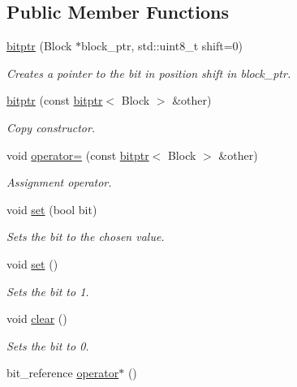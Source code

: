 \subsection*{Public Member Functions}
\begin{DoxyCompactItemize}
\item 
\mbox{\hyperlink{classirk_1_1bitptr_acd28cbb88a0840befdd9bc7a7260f036}{bitptr}} (Block $\ast$block\+\_\+ptr, std\+::uint8\+\_\+t shift=0)
\begin{DoxyCompactList}\small\item\em Creates a pointer to the bit in position {\ttfamily shift} in {\ttfamily block\+\_\+ptr}. \end{DoxyCompactList}\item 
\mbox{\hyperlink{classirk_1_1bitptr_aa1c908a8d26c9286270ccb73ca5a3d85}{bitptr}} (const \mbox{\hyperlink{classirk_1_1bitptr}{bitptr}}$<$ Block $>$ \&other)
\begin{DoxyCompactList}\small\item\em Copy constructor. \end{DoxyCompactList}\item 
void \mbox{\hyperlink{classirk_1_1bitptr_a60b3f1dcb2d6c9f8102c0e077937dcc5}{operator=}} (const \mbox{\hyperlink{classirk_1_1bitptr}{bitptr}}$<$ Block $>$ \&other)
\begin{DoxyCompactList}\small\item\em Assignment operator. \end{DoxyCompactList}\item 
void \mbox{\hyperlink{classirk_1_1bitptr_ab690150f670134eb879fceb83d892073}{set}} (bool bit)
\begin{DoxyCompactList}\small\item\em Sets the bit to the chosen value. \end{DoxyCompactList}\item 
void \mbox{\hyperlink{classirk_1_1bitptr_a11089c343ac361d3ca5d86f8109c2d42}{set}} ()
\begin{DoxyCompactList}\small\item\em Sets the bit to 1. \end{DoxyCompactList}\item 
void \mbox{\hyperlink{classirk_1_1bitptr_acb0f89f9751fc114558234b79d49aac6}{clear}} ()
\begin{DoxyCompactList}\small\item\em Sets the bit to 0. \end{DoxyCompactList}\item 
bit\+\_\+reference \mbox{\hyperlink{classirk_1_1bitptr_a6676fe4fc076f0cb53587ea48d8634c3}{operator$\ast$}} ()

\end{DoxyCompactItemize}
